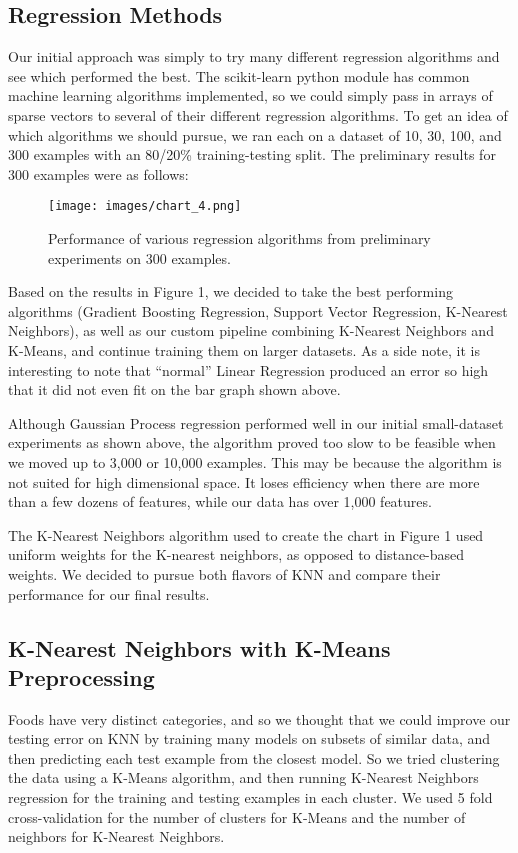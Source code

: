 \documentclass{article}
\begin{document}
\subsection{Regression Methods}
Our initial approach was simply to try many different regression algorithms and see which performed the best. The scikit-learn\cite{scikitLearn} python module has common machine learning algorithms implemented, so we could simply pass in arrays of sparse vectors to several of their different regression algorithms. To get an idea of which algorithms we should pursue, we ran each on a dataset of 10, 30, 100, and 300 examples with an 80/20\% training-testing split. The preliminary results for 300 examples were as follows:

\begin{figure}[ht!]
\centering
\texttt{[image: images/chart\_4.png]}
\caption{Performance of various regression algorithms from preliminary experiments on 300 examples.}
\label{Figure 1}
\end{figure}

Based on the results in Figure 1, we decided to take the best performing algorithms (Gradient Boosting Regression, Support Vector Regression, K-Nearest Neighbors), as well as our custom pipeline combining K-Nearest Neighbors and K-Means, and continue training them on larger datasets. As a side note, it is interesting to note that “normal” Linear Regression produced an error so high that it did not even fit on the bar graph shown above.

Although Gaussian Process regression performed well in our initial small-dataset experiments as shown above, the algorithm proved too slow to be feasible when we moved up to 3,000 or 10,000 examples. This may be because the algorithm is not suited for high dimensional space. It loses efficiency when there are more than a few dozens of features\cite{gaussian}, while our data has over 1,000 features.

The K-Nearest Neighbors algorithm used to create the chart in Figure 1 used uniform weights for the K-nearest neighbors, as opposed to distance-based weights. We decided to pursue both flavors of KNN and compare their performance for our final results.

\subsection{K-Nearest Neighbors with K-Means Preprocessing}
Foods have very distinct categories, and so we thought that we could improve our testing error on KNN by training many models on subsets of similar data, and then predicting each test example from the closest model. So we tried clustering the data using a K-Means algorithm, and then running K-Nearest Neighbors regression for the training and testing examples in each cluster. We used 5 fold cross-validation for the number of clusters for K-Means and the number of neighbors for K-Nearest Neighbors.
\end{document}
